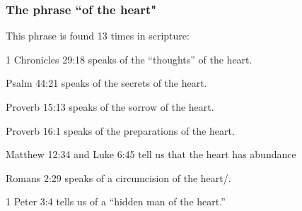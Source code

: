 \subsubsection{The phrase ``of the heart"}

This phrase is found 13 times in scripture:
\begin{compactenum}
    \item 1 Chronicles 29:18 speaks of the ``thoughts'' of the heart.
    \item Psalm 44:21 speaks of the secrets of the heart.
    \item Proverb 15:13 speaks of the sorrow of the heart.
    \item Proverb 16:1 speaks of the preparations of the heart.
    \item Matthew 12:34 and Luke 6:45 tell us that the heart has abundance
    \item Romans 2:29 speaks of a circumcision of the heart/.
    \item 1 Peter 3:4 tells us of a ``hidden man of the heart.''
\end{compactenum}